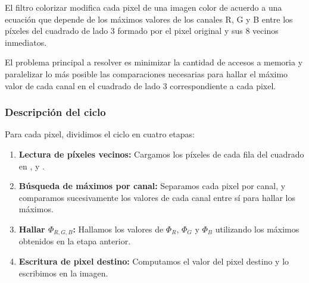 \newcommand{\registro}[4]{
    \ifthenelse{\equal{#1}{}}{}{
        \draw (#2, {#3 + 0.5}) node[anchor=east]{#1};
    }
    
    \foreach \x/\byte in {#4}
    {
        \filldraw[fill=white] ({\x + #2}, #3) rectangle +(1,1) +(0.5, 0.5) node{\byte};
    }    
}

\newcommand{\registroCuatro}[7]{
    \draw (#2, {#3 + 0.5}) node[anchor=east]{#1};
    \draw   (#2, #3) rectangle +(4, 1) +(2, 0.5) node{#4}
          ++(4, 0)   rectangle +(4, 1) +(2, 0.5) node{#5}
          ++(4, 0)   rectangle +(4, 1) +(2, 0.5) node{#6}
          ++(4, 0)   rectangle +(4, 1) +(2, 0.5) node{#7};            
}


El filtro colorizar modifica cada pixel de una imagen color de acuerdo a una ecuación que depende
de los máximos valores de los canales R, G y B entre los píxeles del cuadrado de lado 3 formado
por el pixel original y sus 8 vecinos inmediatos.

El problema principal a resolver es minimizar la cantidad de accesos a memoria y paralelizar lo más
posible las comparaciones necesarias para hallar el máximo valor de cada canal en el cuadrado
de lado 3 correspondiente a cada pixel.




\subsubsection{Descripción del ciclo}

Para cada pixel, dividimos el ciclo en cuatro etapas:

\begin{enumerate}
    \item \textbf{Lectura de píxeles vecinos:}
        Cargamos los píxeles de cada fila del cuadrado en ,  y .
    \item \textbf{Búsqueda de máximos por canal:}
        Separamos cada pixel por canal, y comparamos sucesivamente los valores de cada canal
        entre sí para hallar los máximos.
    \item \textbf{Hallar $\Phi_{R,G,B}$:}
        Hallamos los valores de $\Phi_R$, $\Phi_G$ y $\Phi_B$ utilizando los máximos
        obtenidos en la etapa anterior.
    \item \textbf{Escritura de pixel destino:}
        Computamos el valor del pixel destino y lo escribimos en la imagen.
\end{enumerate}


